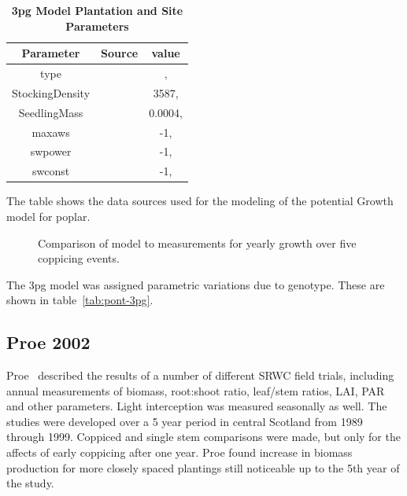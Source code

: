 \documentclass[10pt]{article}
\begin{document}
\begin{table}[!ht]
\caption{
\textbf{\ac{3pg} Model Plantation and Site Parameters}}
\begin{tabular}{|c|c|c|}
\hline
Parameter & Source & value\\
\hline
type &  & ,\\
StockingDensity &  & 3587,\\
SeedlingMass &  & 0.0004,\\
\hline
maxaws &  & -1,\\
swpower &  & -1,\\
swconst &  & -1,\\
\hline
\end{tabular}

\begin{flushleft}The table shows the data sources used for the
  modeling of the potential Growth model for poplar.
\end{flushleft}
\label{tab:3pg-plantation-site}
 \end{table}


\begin{figure}[!ht]
  \centering
  
  \caption{Comparison of model to measurements for yearly growth over five
    coppicing events.}
\label{fig:pont-biomass}
\end{figure}


The \ac{3pg}
model was assigned parametric variations due to genotype.  These are
shown in table~\ref{tab:pont-3pg}.

\begin{table}[!ht]
  \centering
  \caption{\ac{3pg} parameter variations of \ac{3pg} among genotypes}
  \label{tab:pont-3pg}
\end{table}


\subsection*{Proe 2002}

Proe~\cite{Proe2002} described the results of a number of different
\ac{SRWC} field trials, including annual measurements of biomass,
root:shoot ratio, leaf/stem ratios, LAI, PAR and other parameters.
Light interception was measured seasonally as well.  The studies were
developed over a 5 year period in central Scotland from 1989 through
1999. Coppiced and single stem comparisons
were made, but only for the affects of early coppicing after one year.
Proe found increase in biomass production for more closely spaced
plantings still noticeable up to the 5th year of the study.
\end{document}
